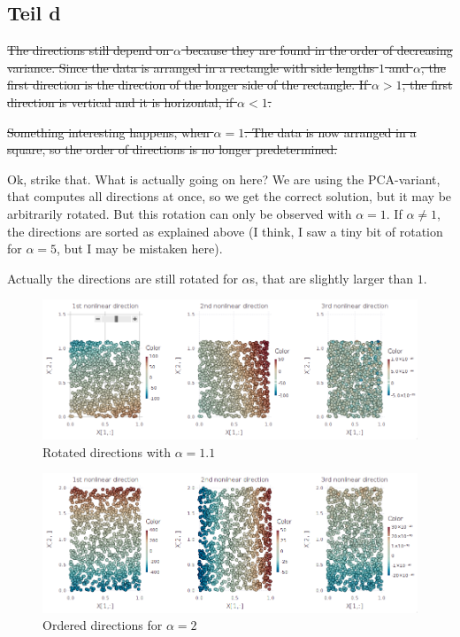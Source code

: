 \documentclass[10pt,a4paper]{article}
\begin{document}
\subsection{Teil d}

\sout{
The directions still depend on $\alpha$ because they are found in the order of
decreasing variance. Since the data is arranged in a rectangle with side lengths
$1$ and $\alpha$, the first direction is the direction of the longer side of the
rectangle. If $\alpha > 1$, the first direction is vertical and it is
horizontal, if $\alpha < 1$.}

\sout{
Something interesting happens, when $\alpha = 1$. The data is now arranged in a
square, so the order of directions is no longer predetermined.
}

Ok, strike that. What is actually going on here? We are using the PCA-variant,
that computes all directions at once, so we get the correct solution, but it may
be arbitrarily rotated. But this rotation can only be observed with
$\alpha = 1$. If $\alpha \ne 1$, the directions are sorted as explained above (I
think, I saw a tiny bit of rotation for $\alpha = 5$, but I may be mistaken
here).

Actually the directions are still rotated for $\alpha$s, that are slightly
larger than $1$.
\begin{figure}[ht!]
  \centering
  \includegraphics[width=350pt]{7_2_d_rotated}
  \caption{Rotated directions with $\alpha = 1.1$}
\end{figure}
\begin{figure}[ht!]
  \centering
  \includegraphics[width=350pt]{7_2_d_straight}
  \caption{Ordered directions for $\alpha = 2$}
\end{figure}
\end{document}
